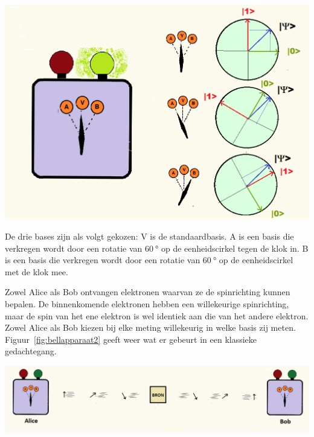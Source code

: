 \documentclass[../../main.tex]{subfiles}
\begin{document}
\begin{flushleft}
\begin{minipage}{.45\textwidth}
\includegraphics[width=\textwidth]{./img/bellapparaat.png}
\end{minipage}%
\hfill
\begin{minipage}{.5\textwidth}
\end{minipage}%
\end{flushleft}
De drie bases zijn als volgt gekozen: V is de standaardbasis. A is een basis die verkregen wordt door een rotatie van $\SI{60}{\degree}$ op de eenheidscirkel tegen de klok in. B is een basis die verkregen wordt door een rotatie van $\SI{60}{\degree}$ op de eenheidscirkel met de klok mee. 

Zowel Alice als Bob ontvangen elektronen waarvan ze de spinrichting kunnen bepalen. De binnenkomende elektronen hebben een willekeurige spinrichting, maar de spin van het ene elektron is wel identiek aan die van het andere elektron. Zowel Alice als Bob kiezen bij elke meting willekeurig in welke basis zij meten. Figuur~\ref{fig:bellapparaat2} geeft weer wat er gebeurt in een klassieke gedachtegang. 

\begin{center}
\leavevmode
\includegraphics[width=\textwidth]{./img/bellapparaat2.png}
\end{center}
\end{document}
